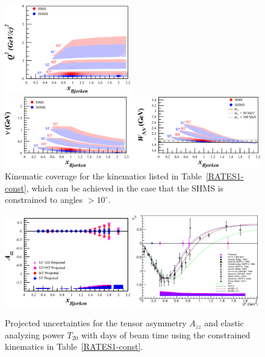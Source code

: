 \begin{figure}
\begin{center}
\includegraphics[width=0.49\textwidth]{figs/q2_shms_const.eps}

\includegraphics[width=\textwidth]{figs/nu_wnn_shms_const.eps}

\caption{\label{kincov-const} Kinematic coverage for the kinematics listed in Table~\ref{RATES1-const}, which can be achieved in the case that the SHMS is constrained to angles $>10^{\circ}$.}
\end{center}
\end{figure}



\begin{figure}
\begin{center}
\includegraphics[width=0.49\textwidth]{figs/Azz_shms_const.eps} \includegraphics[width=0.49\textwidth]{figs/t20_shms_const.eps} 
\caption{\label{PROJ-const}Projected uncertainties for the tensor asymmetry $A_{zz}$ and elastic analyzing power $T_{20}$ with \productiondays days of beam time using the constrained kinematics in Table~\ref{RATES1-const}.
}
\end{center}
\end{figure}
\fi